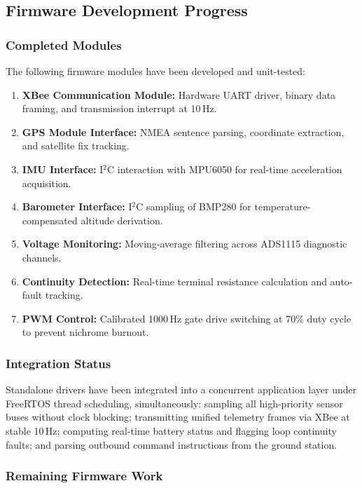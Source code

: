 \subsection{Firmware Development Progress}

\subsubsection{Completed Modules}

The following firmware modules have been developed and unit-tested:
\begin{enumerate}
  \item \textbf{XBee Communication Module:} Hardware UART driver, binary data
    framing, and transmission interrupt at 10\,Hz.
  \item \textbf{GPS Module Interface:} NMEA sentence parsing, coordinate
    extraction, and satellite fix tracking.
  \item \textbf{IMU Interface:} I$^2$C interaction with MPU6050 for real-time
    acceleration acquisition.
  \item \textbf{Barometer Interface:} I$^2$C sampling of BMP280 for
    temperature-compensated altitude derivation.
  \item \textbf{Voltage Monitoring:} Moving-average filtering across ADS1115
    diagnostic channels.
  \item \textbf{Continuity Detection:} Real-time terminal resistance calculation
    and auto-fault tracking.
  \item \textbf{PWM Control:} Calibrated 1000\,Hz gate drive switching at 70\%
    duty cycle to prevent nichrome burnout.
\end{enumerate}

\subsubsection{Integration Status}

Standalone drivers have been integrated into a concurrent application layer under
FreeRTOS thread scheduling, simultaneously: sampling all high-priority sensor
buses without clock blocking; transmitting unified telemetry frames via XBee at
stable 10\,Hz; computing real-time battery status and flagging loop continuity
faults; and parsing outbound command instructions from the ground station.

\subsubsection{Remaining Firmware Work}

